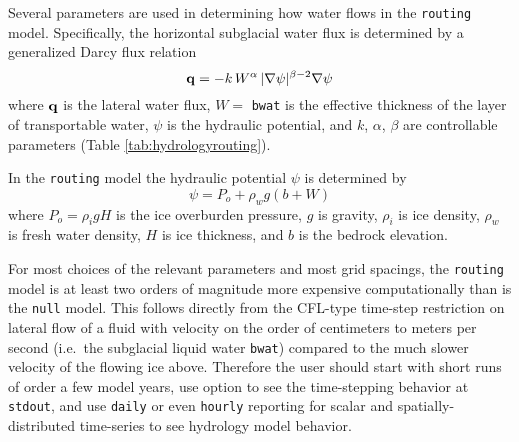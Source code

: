 Several parameters are used in determining how water flows in the \texttt{routing} model.  Specifically, the horizontal subglacial water flux is determined by a generalized Darcy flux relation \cite{Clarke05,Schoofetal2012}
\begin{equation}  \label{eq:flux}
\mathbf{q} = - k\, W^\alpha\, |\nabla \psi|^{\beta-2} \nabla \psi
\end{equation}
where $\mathbf{q}$ is the lateral water flux, $W=$ \texttt{bwat} is the effective thickness of the layer of transportable water, $\psi$ is the hydraulic potential, and $k$, $\alpha$, $\beta$ are controllable parameters (Table \ref{tab:hydrologyrouting}).

In the \texttt{routing} model the hydraulic potential $\psi$ is determined by
\begin{equation}
\psi = P_o + \rho_w g (b + W)  \label{eq:hydraulicpotential}
\end{equation}
where $P_o=\rho_i g H$ is the ice overburden pressure, $g$ is gravity, $\rho_i$ is ice density, $\rho_w$ is fresh water density, $H$ is ice thickness, and $b$ is the bedrock elevation.

For most choices of the relevant parameters and most grid spacings, the \texttt{routing} model is at least two orders of magnitude more expensive computationally than is the \texttt{null} model.  This follows directly from the CFL-type time-step restriction on lateral flow of a fluid with velocity on the order of centimeters to meters per second (i.e.~the subglacial liquid water \texttt{bwat}) compared to the much slower velocity of the flowing ice above.  Therefore the user should start with short runs of order a few model years, use option  to see the time-stepping behavior at \texttt{stdout}, and use \texttt{daily} or even \texttt{hourly} reporting for scalar and spatially-distributed time-series to see hydrology model behavior.

